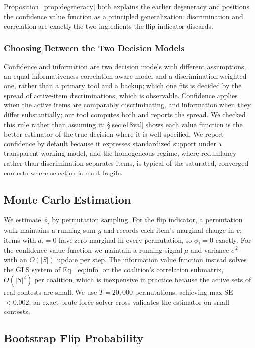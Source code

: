 \documentclass[conference]{IEEEtran}
\begin{document}
Proposition~\ref{prop:degeneracy} both explains the earlier degeneracy and positions the confidence value function as a principled generalization: discrimination and correlation are exactly the two ingredients the flip indicator discards.

\subsubsection{Choosing Between the Two Decision Models}
Confidence and information are two decision models with different assumptions, an equal-informativeness correlation-aware model and a discrimination-weighted one, rather than a primary tool and a backup; which one fits is decided by the spread of active-item discriminations, which is observable.
Confidence applies when the active items are comparably discriminating, and information when they differ substantially; our tool computes both and reports the spread.
We checked this rule rather than assuming it: \S\ref{sec:e18val} shows each value function is the better estimator of the true decision where it is well-specified.
We report confidence by default because it expresses standardized support under a transparent working model, and the homogeneous regime, where redundancy rather than discrimination separates items, is typical of the saturated, converged contests where selection is most fragile.

\subsection{Monte Carlo Estimation}
\label{sec:mc_shapley}

We estimate $\phi_i$ by permutation sampling.
For the flip indicator, a permutation walk maintains a running sum $g$ and records each item's marginal change in $v$; items with $d_i=0$ have zero marginal in every permutation, so $\phi_i=0$ exactly.
For the confidence value function we maintain a running signal $\mu$ and variance $\sigma^2$ with an $O(|S|)$ update per step.
The information value function instead solves the GLS system of Eq.~\ref{eq:info} on the coalition's correlation submatrix, $O(|S|^3)$ per coalition, which is inexpensive in practice because the active sets of real contests are small.
We use $T=20{,}000$ permutations, achieving max SE $<0.002$; an exact brute-force solver cross-validates the estimator on small contests.

\subsection{Bootstrap Flip Probability}
\label{sec:bootstrap}
\end{document}
